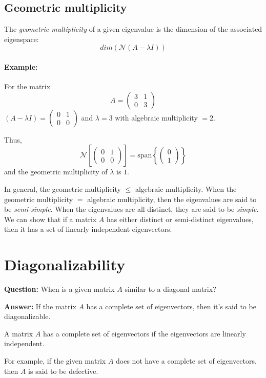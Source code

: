 \subsection{Geometric multiplicity}
The \textit{geometric multiplicity} of a given eigenvalue is the dimension of the associated eigenspace: $$dim(\mathcal{N}(A - \lambda I))$$
\paragraph{Example:}
For the matrix 
\[
A = 
\begin{pmatrix}
3 & 1 \\
0 & 3 
\end{pmatrix}
\]
$(A - \lambda I) = 
\begin{pmatrix}
0 & 1 \\
0 & 0 
\end{pmatrix}
$ and $\lambda = 3$ with algebraic multiplicity $= 2$.

Thus, 
\[
\mathcal{N}
\left[\begin{pmatrix}
0 & 1 \\
0 & 0 
\end{pmatrix}\right]
= \text{span} 
\left\{ \begin{pmatrix}
0 \\
1 
\end{pmatrix} \right\}
\]
and the geometric multiplicity of $\lambda$ is $1$.

In general, the geometric multiplicity $\leq$ algebraic multiplicity.
When the geometric multiplicity $=$ algebraic multiplicity, then the eigenvalues
are said to be \textit{semi-simple}. When the eigenvalues are all distinct,
they are said to be \textit{simple}. We can show that if a matrix $A$ has 
either distinct or semi-distinct eigenvalues, then it has a set of linearly
independent eigenvectors.

\section*{Diagonalizability}

\textbf{Question:} When is a given matrix \( A \) similar to a diagonal matrix?

\textbf{Answer:} If the matrix \( A \) has a complete set of eigenvectors, then it's said to be diagonalizable.

A matrix \( A \) has a complete set of eigenvectors if the eigenvectors are linearly independent.

For example, if the given matrix \( A \) does not have a complete set of eigenvectors, then \( A \) is said to be defective.

